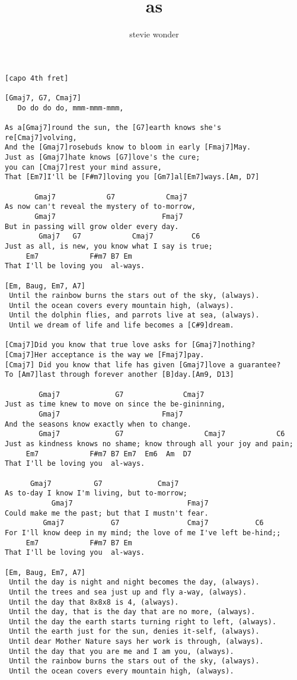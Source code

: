 \author{stevie wonder}
\title{as}
\maketitle
\begin{verbatim}
[capo 4th fret]

[Gmaj7, G7, Cmaj7]
   Do do do do, mmm-mmm-mmm,

As a[Gmaj7]round the sun, the [G7]earth knows she's
re[Cmaj7]volving,
And the [Gmaj7]rosebuds know to bloom in early [Fmaj7]May.
Just as [Gmaj7]hate knows [G7]love's the cure;
you can [Cmaj7]rest your mind assure,
That [Em7]I'll be [F#m7]loving you [Gm7]al[Em7]ways.[Am, D7]

       Gmaj7            G7            Cmaj7
As now can't reveal the mystery of to-morrow,
       Gmaj7                         Fmaj7
But in passing will grow older every day.
        Gmaj7   G7            Cmaj7         C6
Just as all, is new, you know what I say is true;
     Em7            F#m7 B7 Em
That I'll be loving you  al-ways.

[Em, Baug, Em7, A7]
 Until the rainbow burns the stars out of the sky, (always).
 Until the ocean covers every mountain high, (always).
 Until the dolphin flies, and parrots live at sea, (always).
 Until we dream of life and life becomes a [C#9]dream.

[Cmaj7]Did you know that true love asks for [Gmaj7]nothing?
[Cmaj7]Her acceptance is the way we [Fmaj7]pay.
[Cmaj7] Did you know that life has given [Gmaj7]love a guarantee?
To [Am7]last through forever another [B]day.[Am9, D13]

        Gmaj7             G7              Cmaj7
Just as time knew to move on since the be-gininning,
        Gmaj7                        Fmaj7
And the seasons know exactly when to change.
        Gmaj7             G7                   Cmaj7            C6
Just as kindness knows no shame; know through all your joy and pain;
     Em7            F#m7 B7 Em7  Em6  Am  D7
That I'll be loving you  al-ways.

      Gmaj7          G7             Cmaj7
As to-day I know I'm living, but to-morrow;
           Gmaj7                           Fmaj7
Could make me the past; but that I mustn't fear.
         Gmaj7           G7                Cmaj7           C6
For I'll know deep in my mind; the love of me I've left be-hind;;
     Em7            F#m7 B7 Em
That I'll be loving you  al-ways.

[Em, Baug, Em7, A7]
 Until the day is night and night becomes the day, (always).
 Until the trees and sea just up and fly a-way, (always).
 Until the day that 8x8x8 is 4, (always).
 Until the day, that is the day that are no more, (always).
 Until the day the earth starts turning right to left, (always).
 Until the earth just for the sun, denies it-self, (always).
 Until dear Mother Nature says her work is through, (always).
 Until the day that you are me and I am you, (always).
 Until the rainbow burns the stars out of the sky, (always).
 Until the ocean covers every mountain high, (always).
\end{verbatim}